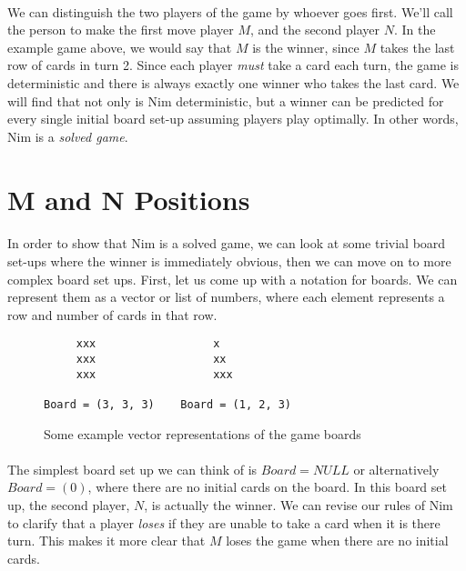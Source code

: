 \documentclass{article}
\begin{document}
\paragraph{}
We can distinguish the two players of the game by whoever goes first. We'll call the person to make the first move player $M$, and the second player $N$. In the example game above, we would say that $M$ is the winner, since $M$ takes the last row of cards in turn 2. Since each player \textit{must} take a card each turn, the game is deterministic and there is always exactly one winner who takes the last card. We will find that not only is Nim deterministic, but a winner can be predicted for every single initial board set-up assuming players play optimally. In other words, Nim is a \textit{solved game}.

\pagebreak
\section*{M and N Positions}

\paragraph{}
In order to show that Nim is a solved game, we can look at some trivial board set-ups where the winner is immediately obvious, then we can move on to more complex board set ups. First, let us come up with a notation for boards. We can represent them as a vector or list of numbers, where each element represents a row and number of cards in that row.\\

\begin{figure}[h]
    \center
    \begin{BVerbatim}
     xxx                  x
     xxx                  xx
     xxx                  xxx

Board = (3, 3, 3)    Board = (1, 2, 3)
    \end{BVerbatim}
    \caption{Some example vector representations of the game boards}
\end{figure}

\paragraph{}
The simplest board set up we can think of is $Board = NULL$ or alternatively $Board = (0)$, where there are no initial cards on the board. In this board set up, the second player, $N$, is actually the winner. We can revise our rules of Nim to clarify that a player \textit{loses} if they are unable to take a card when it is there turn. This makes it more clear that $M$ loses the game when there are no initial cards.
\end{document}
